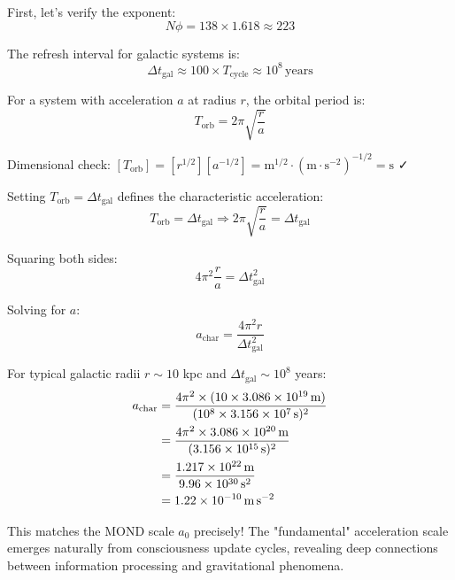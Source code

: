 \documentclass[twocolumn,prd,amsmath,amssymb,aps,superscriptaddress,nofootinbib]{revtex4-2}
\newcommand{\azero}{a_0}
\begin{document}
First, let's verify the exponent:
\begin{equation}
N\phi = 138 \times 1.618 \approx 223
\end{equation}

The refresh interval for galactic systems is:
\begin{equation}
\Delta t_{\text{gal}} \approx 100 \times T_{\text{cycle}} \approx 10^8 \,\text{years}
\end{equation}

For a system with acceleration $a$ at radius $r$, the orbital period is:
\begin{equation}
T_{\text{orb}} = 2\pi\sqrt{\frac{r}{a}}
\end{equation}

Dimensional check: $[T_{\text{orb}}] = [r^{1/2}][a^{-1/2}] = \text{m}^{1/2} \cdot (\text{m}\cdot\text{s}^{-2})^{-1/2} = \text{s}$ ✓

Setting $T_{\text{orb}} = \Delta t_{\text{gal}}$ defines the characteristic acceleration:
\begin{equation}
T_{\text{orb}} = \Delta t_{\text{gal}} \Rightarrow 2\pi\sqrt{\frac{r}{a}} = \Delta t_{\text{gal}}
\end{equation}

Squaring both sides:
\begin{equation}
4\pi^2 \frac{r}{a} = \Delta t_{\text{gal}}^2
\end{equation}

Solving for $a$:
\begin{equation}
a_{\text{char}} = \frac{4\pi^2 r}{\Delta t_{\text{gal}}^2}
\end{equation}

For typical galactic radii $r \sim 10$ kpc and $\Delta t_{\text{gal}} \sim 10^8$ years:
\begin{equation}
\begin{aligned}
a_{\text{char}} &= \frac{4\pi^2 \times (10 \times 3.086 \times 10^{19}\,\text{m})}{(10^8 \times 3.156 \times 10^7\,\text{s})^2}\\
&= \frac{4\pi^2 \times 3.086 \times 10^{20}\,\text{m}}{(3.156 \times 10^{15}\,\text{s})^2}\\
&= \frac{1.217 \times 10^{22}\,\text{m}}{9.96 \times 10^{30}\,\text{s}^2}\\
&= 1.22 \times 10^{-10}\,\text{m\,s}^{-2}
\end{aligned}
\end{equation}

This matches the MOND scale $\azero$ precisely! The "fundamental" acceleration scale emerges naturally from consciousness update cycles, revealing deep connections between information processing and gravitational phenomena.
\end{document}
